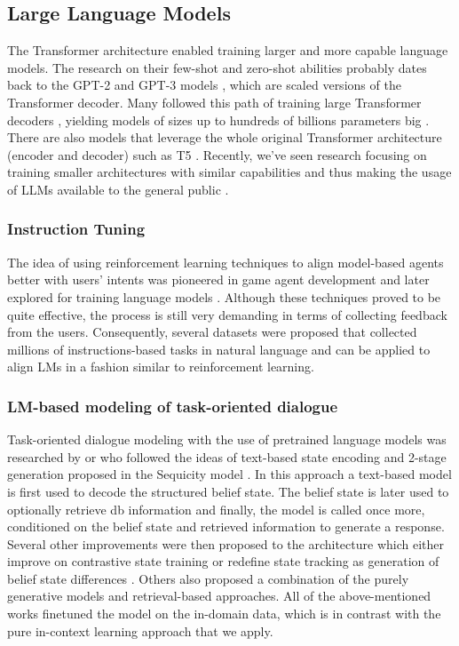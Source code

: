 \subsection{Large Language Models}
The Transformer architecture \cite{vaswani2017attention} enabled training larger and more capable language models.
The research on their few-shot and zero-shot abilities probably dates back to the GPT-2 and GPT-3 models \cite{radford2019language,brown2020language}, which are scaled versions of the Transformer decoder.
Many followed this path of training large Transformer decoders \cite{zhang2022opt,black2022gpt}, yielding models of sizes up to hundreds of billions parameters big \cite{zhao_survey_2023}.
There are also models that leverage the whole original Transformer architecture (encoder and decoder) such as T5 \cite{2020t5}.
Recently, we've seen research focusing on training smaller architectures with similar capabilities and thus making the usage of LLMs available to the general public \cite{touvron2023llama}.

\subsubsection{Instruction Tuning}
The idea of using reinforcement learning techniques to align model-based agents better with users' intents was pioneered in game agent development \cite{christiano2017deep} and later explored for training language models \cite{ziegler2019fine,ouyang2022training}.
Although these techniques proved to be quite effective, the process is still very demanding in terms of collecting feedback from the users.
Consequently, several datasets were proposed \cite{supernaturalinstructions,iyer2022opt,black2022gpt} that collected millions of instructions-based tasks in natural language and can be applied to align LMs in a fashion similar to reinforcement learning.

\subsubsection{LM-based modeling of task-oriented dialogue}
Task-oriented dialogue modeling with the use of pretrained language models was researched by \citet{zhang2019dialogpt} or \citet{peng-etal-2021-soloist} who followed the ideas of text-based state encoding and 2-stage generation proposed in the Sequicity model \cite{lei2018sequicity}.
In this approach a text-based model is first used to decode the structured belief state.
The belief state is later used to optionally retrieve db information and finally, the model is called once more, conditioned on the belief state and retrieved information to generate a response.
Several other improvements were then proposed to the architecture which either improve on contrastive state training \cite{kulhanek-etal-2021-augpt} or redefine state tracking as generation of belief state differences \cite{lin-etal-2020-mintl}.
Others also proposed a combination of the purely generative models and retrieval-based approaches\cite{pandey-etal-2018-exemplar,cai-etal-2019-retrieval,nekvinda-dusek-2022-aargh}.
All of the above-mentioned works finetuned the model on the in-domain data, which is in contrast with the pure in-context learning approach that we apply.

